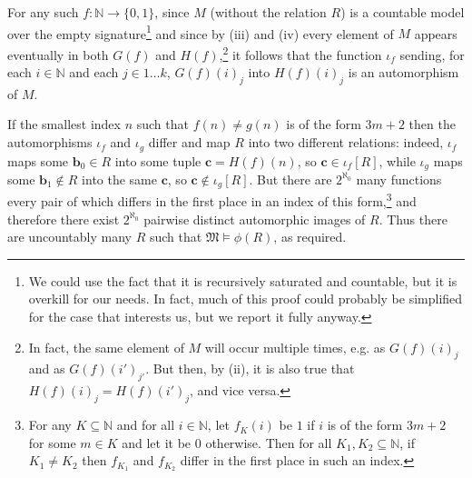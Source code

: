 \documentclass{article}
\theoremstyle{definition}
\newcommand{\tuple}{\mathbf}
\newcommand{\M}{\mathfrak M}
\begin{document}
	For any such $f: \mathbb N \rightarrow \{0,1\}$, since $M$ (without the relation $R$) is a countable model over the empty signature\footnote{We could use the fact that it is recursively saturated and countable, but it is overkill for our needs. In fact, much of this proof could probably be simplified for the case that interests us, but we report it fully anyway.} and since by (iii) and (iv) every element of $M$ appears eventually in both $G(f)$ and $H(f)$,\footnote{In fact, the same element of $M$ will occur multiple times, e.g. as $G(f)(i)_j$ and as $G(f)(i')_{j'}$. But then, by (ii), it is also true that $H(f)(i)_j = H(f)(i')_j$, and vice versa.} it follows that the function $\iota_f$ sending, for each $i \in \mathbb N$ and each $j \in 1 \ldots k$, $G(f)(i)_j$ into $H(f)(i)_j$ is an automorphism of $M$. 

	If the smallest index $n$ such that $f(n) \not = g(n)$ is of the form $3m+2$ then the automorphisms $\iota_f$ and $\iota_g$ differ and map $R$ into two different relations: indeed, $\iota_f$ maps some $\tuple b_0 \in R$ into some tuple $\tuple c = H(f)(n)$, so $\tuple c \in \iota_f[R]$, while $\iota_g$ maps some $\tuple b_1 \not \in R$ into the same $\tuple c$, so $\tuple c \not \in \iota_g[R]$. But there are $2^{\aleph_0}$ many functions every pair of which differs in the first place in an index of this form,\footnote{For any $K \subseteq \mathbb N$ and for all $i \in \mathbb N$, let $f_K(i)$ be $1$ if $i$ is of the form $3m+2$ for some $m \in K$ and let it be $0$ otherwise. Then for all $K_1, K_2 \subseteq \mathbb N$, if $K_1 \not = K_2$ then $f_{K_1}$ and $f_{K_2}$ differ in the first place in such an index.} and therefore there exist $2^{\aleph_0}$ pairwise distinct automorphic images of $R$. Thus there are uncountably many $R$ such that $\M \models \phi(R)$, as required.\\
\end{document}
